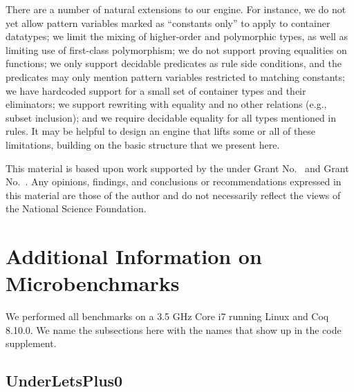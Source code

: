 \documentclass[sigplan,10pt,review,anonymous]{acmart}\settopmatter{printfolios=true,printccs=false,printacmref=false}
\begin{document}
There are a number of natural extensions to our engine.
For instance, we do not yet allow pattern variables marked as ``constants only'' to apply to container datatypes; we limit the mixing of higher-order and polymorphic types, as well as limiting use of first-class polymorphism; we do not support proving equalities on functions; we only support decidable predicates as rule side conditions, and the predicates may only mention pattern variables restricted to matching constants; we have hardcoded support for a small set of container types and their eliminators; we support rewriting with equality and no other relations (e.g., subset inclusion); and we require decidable equality for all types mentioned in rules.
It may be helpful to design an engine that lifts some or all of these limitations, building on the basic structure that we present here.

\begin{acks}                            %
  This material is based upon work supported by the
   under Grant
  No.~ and Grant
  No.~.  Any opinions, findings, and
  conclusions or recommendations expressed in this material are those
  of the author and do not necessarily reflect the views of the
  National Science Foundation.
\end{acks}


\nocite{*}


\clearpage
\appendix
\section{Additional Information on Microbenchmarks} \label{sec:additionalMicro}

We performed all benchmarks on a 3.5 GHz Core i7 running Linux and Coq 8.10.0.
We name the subsections here with the names that show up in the code supplement.

\subsection{UnderLetsPlus0} \label{sec:UnderLetsPlus0-more}
\end{document}
